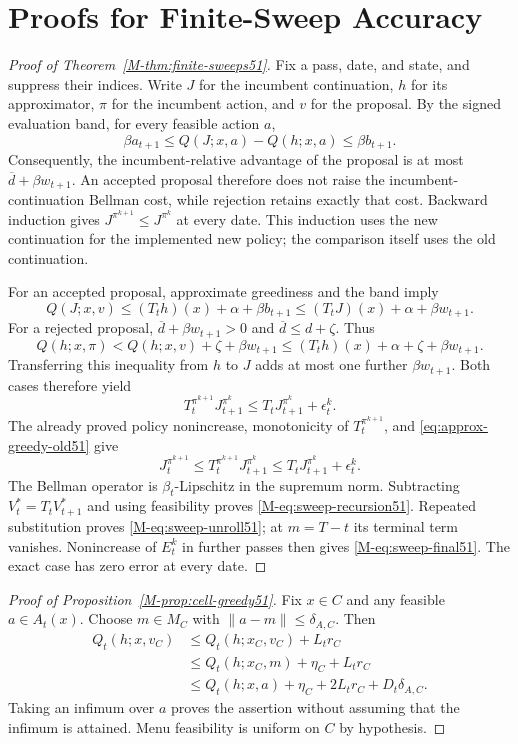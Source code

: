 \section{Proofs for Finite-Sweep Accuracy}\label{app:finite-sweeps51}
\begin{proof}[Proof of Theorem~\ref{M-thm:finite-sweeps51}]
Fix a pass, date, and state, and suppress their indices. Write $J$ for the
incumbent continuation, $h$ for its approximator, $\pi$ for the incumbent
action, and $v$ for the proposal. By the signed evaluation band, for every
feasible action $a$,
\[
 \beta a_{t+1}\leq Q(J;x,a)-Q(h;x,a)\leq\beta b_{t+1}.
\]
Consequently, the incumbent-relative advantage of the proposal is at most
$\overline d+\beta w_{t+1}$. An accepted proposal therefore does not raise
the incumbent-continuation Bellman cost, while rejection retains exactly that
cost. Backward induction gives $J^{\pi^{k+1}}\leq J^{\pi^k}$ at every
date. This induction uses the new continuation for the implemented new
policy; the comparison itself uses the old continuation.

For an accepted proposal, approximate greediness and the band imply
\[
 Q(J;x,v)\leq (T_th)(x)+\alpha+\beta b_{t+1}
 \leq (T_tJ)(x)+\alpha+\beta w_{t+1}.
\]
For a rejected proposal, $\overline d+\beta w_{t+1}>0$ and
$\overline d\leq d+\zeta$. Thus
\[
 Q(h;x,\pi)<Q(h;x,v)+\zeta+\beta w_{t+1}
 \leq(T_th)(x)+\alpha+\zeta+\beta w_{t+1}.
\]
Transferring this inequality from $h$ to $J$ adds at most one further
$\beta w_{t+1}$. Both cases therefore yield
\begin{equation}\label{eq:approx-greedy-old51}
 T_t^{\pi^{k+1}}J_{t+1}^{\pi^k}
 \leq T_tJ_{t+1}^{\pi^k}+\epsilon_t^k.
\end{equation}
The already proved policy nonincrease, monotonicity of
$T_t^{\pi^{k+1}}$, and \eqref{eq:approx-greedy-old51} give
\[
 J_t^{\pi^{k+1}}\leq T_t^{\pi^{k+1}}J_{t+1}^{\pi^k}
 \leq T_tJ_{t+1}^{\pi^k}+\epsilon_t^k.
\]
The Bellman operator is $\beta_t$-Lipschitz in the supremum norm. Subtracting
$V_t^*=T_tV_{t+1}^*$ and using feasibility proves
\eqref{M-eq:sweep-recursion51}. Repeated substitution proves
\eqref{M-eq:sweep-unroll51}; at $m=T-t$ its terminal term vanishes.
Nonincrease of $E_t^k$ in further passes then gives
\eqref{M-eq:sweep-final51}. The exact case has zero error at every date.
\end{proof}

\begin{proof}[Proof of Proposition~\ref{M-prop:cell-greedy51}]
Fix $x\in C$ and any feasible $a\in A_t(x)$. Choose $m\in M_C$ with
$\|a-m\|\leq\delta_{A,C}$. Then
\begin{align*}
 Q_t(h;x,v_C)&\leq Q_t(h;x_C,v_C)+L_tr_C\\
 &\leq Q_t(h;x_C,m)+\eta_C+L_tr_C\\
 &\leq Q_t(h;x,a)+\eta_C+2L_tr_C+D_t\delta_{A,C}.
\end{align*}
Taking an infimum over $a$ proves the assertion without assuming that the
infimum is attained. Menu feasibility is uniform on $C$ by hypothesis.
\end{proof}

